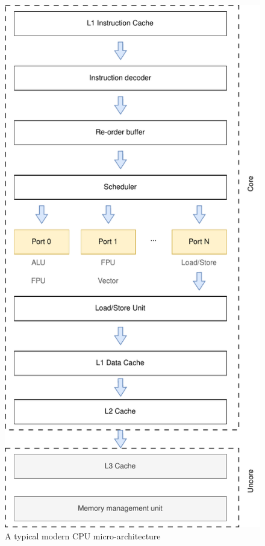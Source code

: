 \begin{figure}[h!]
  \includegraphics[scale=0.5]{cpu_uarch.pdf}
  \centering
  \caption{A typical modern CPU micro-architecture}
\end{figure}

